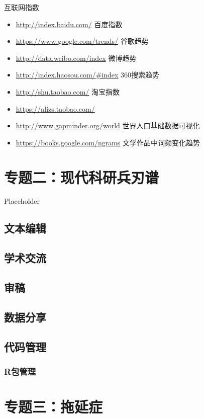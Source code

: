 \documentclass[]{book}
\providecommand{\tightlist}{%
  \setlength{\itemsep}{0pt}\setlength{\parskip}{0pt}}
\begin{document}
互联网指数

\begin{itemize}
\tightlist
\item
  \url{http://index.baidu.com/} 百度指数
\item
  \url{https://www.google.com/trends/} 谷歌趋势
\item
  \url{http://data.weibo.com/index} 微博趋势
\item
  \url{http://index.haosou.com/\#index} 360搜索趋势
\item
  \url{http://shu.taobao.com/} 淘宝指数
\item
  \url{https://alizs.taobao.com/}
\item
  \url{http://www.gapminder.org/world} 世界人口基础数据可视化
\item
  \url{https://books.google.com/ngrams} 文学作品中词频变化趋势
\end{itemize}

\chapter{专题二：现代科研兵刃谱}

Placeholder

\section{文本编辑}

\section{学术交流}

\section{审稿}\label{-1}

\section{数据分享}

\section{代码管理}

\subsection{R包管理}\label{r}

\chapter{专题三：拖延症}
\end{document}
